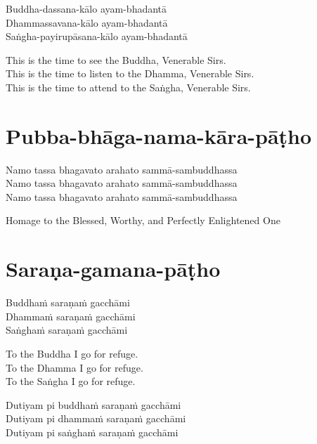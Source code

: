 Buddha-dassana-kālo ayam-bhadantā\\
Dhammassavana-kālo ayam-bhadantā\\
Saṅgha-payirupāsana-kālo ayam-bhadantā

\begin{english-verses}
  This is the time to see the Buddha, Venerable Sirs.\\
  This is the time to listen to the Dhamma, Venerable Sirs.\\
  This is the time to attend to the Saṅgha, Venerable Sirs.
\end{english-verses}

\suttaRef{[Thai]}

\section{Pubba-bhāga-nama-kāra-pāṭho}
\label{pubba-bhaga-nama-kara-patho}
Namo tassa bhagavato arahato sammā-sambuddhassa\\
Namo tassa bhagavato arahato sammā-sambuddhassa\\
Namo tassa bhagavato arahato sammā-sambuddhassa

\begin{english-verses}
  Homage to the Blessed, Worthy, and Perfectly Enlightened One
\end{english-verses}

\section{Saraṇa-gamana-pāṭho}
\label{sarana-gamana-patho}
Buddhaṁ saraṇaṁ gacchāmi\\
Dhammaṁ saraṇaṁ gacchāmi\\
Saṅghaṁ saraṇaṁ gacchāmi

\begin{english-verses}
  To the Buddha I go for refuge.\\
  To the Dhamma I go for refuge.\\
  To the Saṅgha I go for refuge.
\end{english-verses}

Dutiyam pi buddhaṁ saraṇaṁ gacchāmi\\
Dutiyam pi dhammaṁ saraṇaṁ gacchāmi\\
Dutiyam pi saṅghaṁ saraṇaṁ gacchāmi

